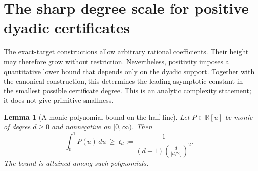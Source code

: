 \documentclass[11pt,a4paper]{article}
\newtheorem{lemma}[theorem]{Lemma}
\theoremstyle{definition}
\theoremstyle{remark}
\begin{document}
\section{The sharp degree scale for positive dyadic certificates}
\label{unified-degree-section}

The exact-target constructions allow arbitrary rational coefficients.  Their
height may therefore grow without restriction.  Nevertheless, positivity
imposes a quantitative lower bound that depends only on the dyadic support.
Together with the canonical construction, this determines the leading
asymptotic constant in the smallest possible certificate degree.  This is
an analytic complexity statement; it does not give primitive smallness.

\begin{lemma}[A monic polynomial bound on the half-line]
\label{unified-degree-monic}
Let $P\in\mathbb R[u]$ be monic of degree $d\ge0$ and nonnegative on
$[0,\infty)$.  Then
\[
 \int_0^1 P(u)\,du\ \ge\
 \mathfrak c_d:=\frac{1}{(d+1)\binom{d}{\lfloor d/2\rfloor}^{\!2}}.
\]
The bound is attained among such polynomials.
\end{lemma}
\end{document}
